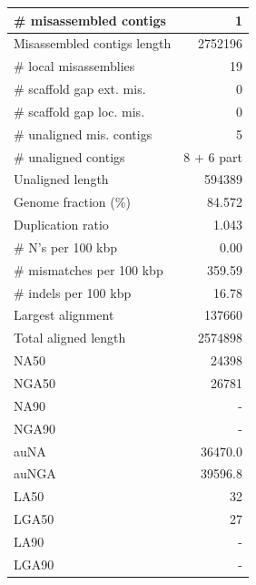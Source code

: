 \documentclass[12pt,a4paper]{article}
\begin{document}
\begin{table}[ht]
\begin{center}
\begin{tabular}{|l*{1}{|r}|}
\# misassembled contigs & 1 \\ \hline
Misassembled contigs length & 2752196 \\ \hline
\# local misassemblies & 19 \\ \hline
\# scaffold gap ext. mis. & 0 \\ \hline
\# scaffold gap loc. mis. & 0 \\ \hline
\# unaligned mis. contigs & 5 \\ \hline
\# unaligned contigs & 8 + 6 part \\ \hline
Unaligned length & 594389 \\ \hline
Genome fraction (\%) & 84.572 \\ \hline
Duplication ratio & 1.043 \\ \hline
\# N's per 100 kbp & 0.00 \\ \hline
\# mismatches per 100 kbp & 359.59 \\ \hline
\# indels per 100 kbp & 16.78 \\ \hline
Largest alignment & 137660 \\ \hline
Total aligned length & 2574898 \\ \hline
NA50 & 24398 \\ \hline
NGA50 & 26781 \\ \hline
NA90 & - \\ \hline
NGA90 & - \\ \hline
auNA & 36470.0 \\ \hline
auNGA & 39596.8 \\ \hline
LA50 & 32 \\ \hline
LGA50 & 27 \\ \hline
LA90 & - \\ \hline
LGA90 & - \\ \hline
\end{tabular}
\end{center}
\end{table}
\end{document}
